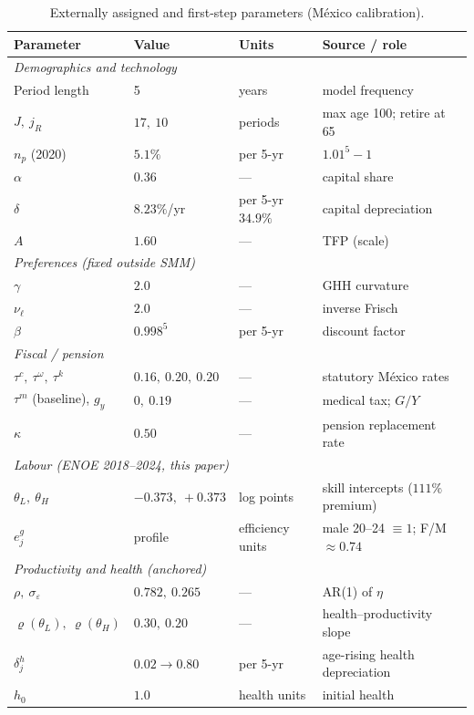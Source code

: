 \documentclass[12pt,a4paper]{article}
\begin{document}
\begin{table}[H]
\centering
\caption{Externally assigned and first-step parameters (M\'exico calibration).}
\label{tab:firststep_params}
\begin{tabular}{llll}
\toprule
Parameter & Value & Units & Source / role \\
\midrule
\multicolumn{4}{l}{\emph{Demographics and technology}}\\
\quad Period length            & 5 & years & model frequency \\
\quad $J,\ j_R$                & $17,\ 10$ & periods & max age 100; retire at 65 \\
\quad $n_p$ (2020)            & $5.1\%$ & per 5-yr & $1.01^5-1$ \\
\quad $\alpha$                & $0.36$ & --- & capital share \\
\quad $\delta$                & $8.23\%$/yr & per 5-yr $34.9\%$ & capital depreciation \\
\quad $A$                     & $1.60$ & --- & TFP (scale) \\
\midrule
\multicolumn{4}{l}{\emph{Preferences (fixed outside SMM)}}\\
\quad $\gamma$                & $2.0$ & --- & GHH curvature \\
\quad $\nu_\ell$              & $2.0$ & --- & inverse Frisch \\
\quad $\beta$                 & $0.998^5$ & per 5-yr & discount factor \\
\midrule
\multicolumn{4}{l}{\emph{Fiscal / pension}}\\
\quad $\tau^c,\ \tau^\omega,\ \tau^k$ & $0.16,\ 0.20,\ 0.20$ & --- & statutory M\'exico rates \\
\quad $\tau^m$ (baseline), $g_y$      & $0,\ 0.19$ & --- & medical tax; $G/Y$ \\
\quad $\kappa$                & $0.50$ & --- & pension replacement rate \\
\midrule
\multicolumn{4}{l}{\emph{Labour (ENOE 2018--2024, this paper)}}\\
\quad $\theta_L,\ \theta_H$   & $-0.373,\ +0.373$ & log points & skill intercepts ($111\%$ premium) \\
\quad $e^g_j$                 & profile & efficiency units & male 20--24 $\equiv 1$; F/M $\approx0.74$ \\
\midrule
\multicolumn{4}{l}{\emph{Productivity and health (anchored)}}\\
\quad $\rho,\ \sigma_\varepsilon$ & $0.782,\ 0.265$ & --- & AR(1) of $\eta$ \\
\quad $\varrho(\theta_L),\ \varrho(\theta_H)$ & $0.30,\ 0.20$ & --- & health--productivity slope \\
\quad $\delta^h_j$            & $0.02\!\to\!0.80$ & per 5-yr & age-rising health depreciation \\
\quad $h_0$                   & $1.0$ & health units & initial health \\
\bottomrule
\end{tabular}


\end{table}
\end{document}
